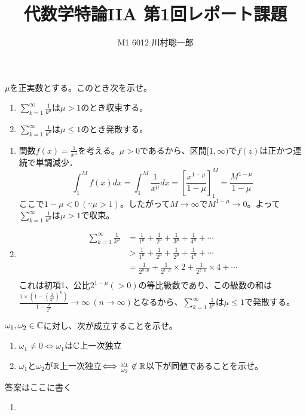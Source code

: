 \documentclass[dvipdfmx]{jsreport}
\title{代数学特論IIA 第1回レポート課題}
\author{M1 6012 川村聡一郎}
\date{}
\begin{document}
\maketitle

\begin{tcolorbox}[title= レポート課題1]
	$\mu$を正実数とする。このとき次を示せ。
\begin{enumerate}
	\item $\sum_{k= 1}^\infty \frac{1}{k^\mu}$は$\mu> 1$のとき収束する。
	\item $\sum_{k= 1}^\infty \frac{1}{k^\mu}$は$\mu\le 1$のとき発散する。
\end{enumerate}
\end{tcolorbox}

\begin{souanswer}
\begin{enumerate}
	\item 関数$f(x)= \frac{1}{x^\mu}$を考える。$\mu> 0$であるから、区間$[1, \infty)$で$f(z)$は正かつ連続で単調減少．
\begin{equation*}
	\int_1^M f(x)dx= \int_1^M \frac{1}{x^\mu} dx= \left[\frac{x^{1- \mu}}{1- \mu}\right]_1^M= \frac{M^{1- \mu}}{1- \mu}
\end{equation*}
	ここで$1- \mu< 0\ (\because \mu> 1)$。したがって$M\to \infty$で$M^{1- \mu}\to 0$。よって$\sum_{k= 1}^\infty \frac{1}{k^\mu}$は$\mu> 1$で収束。
	
	\item 
\begin{align*}
	\sum_{k= 1}^\infty \frac{1}{k^\mu}
	&= \frac{1}{1^\mu}+ \frac{1}{2^\mu}+ \frac{1}{3^\mu}+ \frac{1}{4^\mu}+ \cdots\\
	&> \frac{1}{1^\mu}+ \frac{1}{2^\mu}+ \frac{1}{2^\mu}+ \frac{1}{4^\mu}+ \cdots\\
	&= \frac{1}{2^{0\cdot \mu}}+ \frac{1}{2^{1\cdot \mu}}\times 2+ \frac{1}{2^{2\cdot \mu}}\times 4+ \cdots\\
\end{align*}
	これは初項1、公比$2^{1- \mu}(> 0)$の等比級数であり、この級数の和は$\frac{1\times\left(1- \left(\frac{2}{2^\mu}\right)^n\right)}{1- \frac{2}{2^\mu}}\to \infty\ (n\to \infty)$となるから、$\sum_{k= 1}^\infty \frac{1}{k^\mu}$は$\mu\le 1$で発散する。
\end{enumerate}	
\end{souanswer}


\begin{tcolorbox}[title= レポート課題2]
	$\omega_1, \omega_2\in \mathbb{C}$に対し、次が成立することを示せ。
\begin{enumerate}
	\item $\omega_1\ne 0\Longleftrightarrow \omega_1$は$\mathbb{C}$上一次独立
	\item $\omega_1$と$\omega_2$が$\mathbb{R}$上一次独立$\Longleftrightarrow \frac{\omega_1}{\omega_2}\not\in \mathbb{R}$以下が同値であることを示せ。
\end{enumerate}
\end{tcolorbox}

\begin{souanswer} %
	答案はここに書く
\begin{enumerate}
	\item 
\end{enumerate}	
\end{souanswer}
\end{document}
